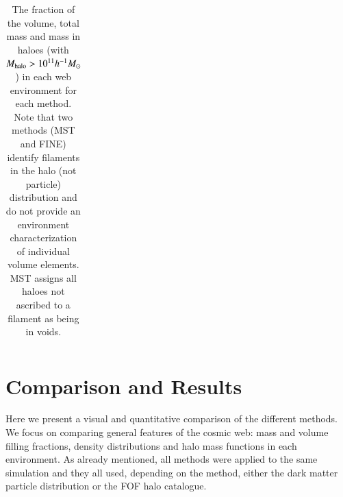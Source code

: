 \documentclass[useAMS,usenatbib]{mnras}
\begin{document}
\begin{center}
\begin{table}
\begin{flushright}
\begin{tabular}{|c|cccc|cccc|cccc|}
 & &&&&&&&&&&&\\
\hline
\end{tabular}
\vskip 0.5cm
\caption{The fraction of the volume, total mass and mass in haloes (with $M_{\rm halo} > 10^{11}h^{-1}M_{\odot}$) in each web environment for each method. Note that two methods (MST and FINE) identify filaments in the halo (not particle) distribution and do not provide an environment characterization of individual volume elements. MST assigns all haloes not ascribed to a filament as being in voids.}
  \label{tab:mff}
\end{flushright}
\end{table}
\end{center}

\section{Comparison and Results}
\label{sec:results}

Here we present a visual and quantitative comparison of the different methods. We focus on comparing general features of the cosmic web: mass and volume filling fractions, density distributions and halo mass functions in each environment. As already mentioned, all methods were applied to the same simulation and they all used, depending on the method, either the dark matter particle distribution or the FOF halo catalogue.
\end{document}
